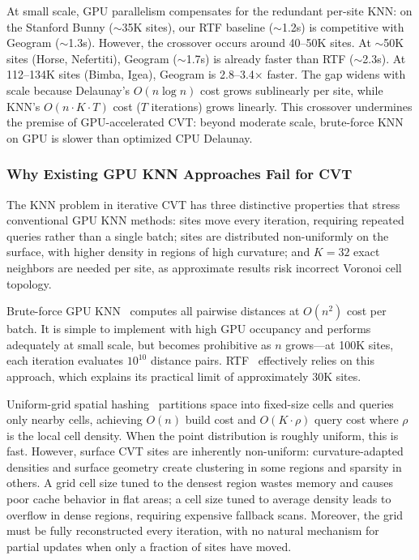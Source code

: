 At small scale, GPU parallelism compensates for the redundant per-site KNN: on the Stanford Bunny ($\sim$35K sites), our RTF baseline ($\sim$1.2s) is competitive with Geogram ($\sim$1.3s). However, the crossover occurs around 40--50K sites. At $\sim$50K sites (Horse, Nefertiti), Geogram ($\sim$1.7s) is already faster than RTF ($\sim$2.3s). At 112--134K sites (Bimba, Igea), Geogram is 2.8--3.4$\times$ faster. The gap widens with scale because Delaunay's $O(n \log n)$ cost grows sublinearly per site, while KNN's $O(n \cdot K \cdot T)$ cost ($T$ iterations) grows linearly. This crossover undermines the premise of GPU-accelerated CVT: beyond moderate scale, brute-force KNN on GPU is slower than optimized CPU Delaunay.

\subsubsection{Why Existing GPU KNN Approaches Fail for CVT}

The KNN problem in iterative CVT has three distinctive properties that stress conventional GPU KNN methods: sites move every iteration, requiring repeated queries rather than a single batch; sites are distributed non-uniformly on the surface, with higher density in regions of high curvature; and $K=32$ exact neighbors are needed per site, as approximate results risk incorrect Voronoi cell topology.

Brute-force GPU KNN~\cite{garcia2008knn} computes all pairwise distances at $O(n^2)$ cost per batch. It is simple to implement with high GPU occupancy and performs adequately at small scale, but becomes prohibitive as $n$ grows---at 100K sites, each iteration evaluates $10^{10}$ distance pairs. RTF~\cite{yao2023rtf} effectively relies on this approach, which explains its practical limit of approximately 30K sites.

Uniform-grid spatial hashing~\cite{teschner2003hashing, green2008cuda} partitions space into fixed-size cells and queries only nearby cells, achieving $O(n)$ build cost and $O(K \cdot \rho)$ query cost where $\rho$ is the local cell density. When the point distribution is roughly uniform, this is fast. However, surface CVT sites are inherently non-uniform: curvature-adapted densities and surface geometry create clustering in some regions and sparsity in others. A grid cell size tuned to the densest region wastes memory and causes poor cache behavior in flat areas; a cell size tuned to average density leads to overflow in dense regions, requiring expensive fallback scans. Moreover, the grid must be fully reconstructed every iteration, with no natural mechanism for partial updates when only a fraction of sites have moved.

